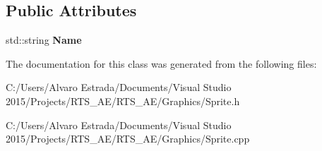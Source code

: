 \subsection*{Public Attributes}
\begin{DoxyCompactItemize}
\item 
std\+::string {\bfseries Name}\hypertarget{class_c_sprite_a8b0b928d672c11342a8381d065c99a27}{}\label{class_c_sprite_a8b0b928d672c11342a8381d065c99a27}

\end{DoxyCompactItemize}


The documentation for this class was generated from the following files\+:\begin{DoxyCompactItemize}
\item 
C\+:/\+Users/\+Alvaro Estrada/\+Documents/\+Visual Studio 2015/\+Projects/\+R\+T\+S\+\_\+\+A\+E/\+R\+T\+S\+\_\+\+A\+E/\+Graphics/Sprite.\+h\item 
C\+:/\+Users/\+Alvaro Estrada/\+Documents/\+Visual Studio 2015/\+Projects/\+R\+T\+S\+\_\+\+A\+E/\+R\+T\+S\+\_\+\+A\+E/\+Graphics/Sprite.\+cpp\end{DoxyCompactItemize}
